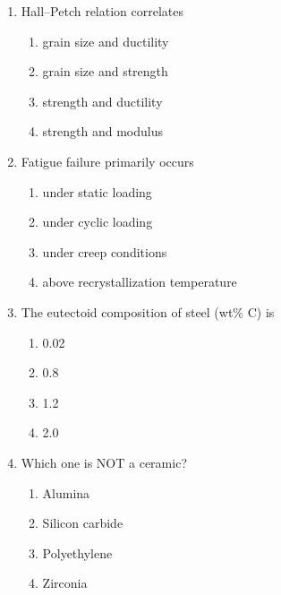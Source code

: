 \documentclass[journal,12pt,onecolumn]{IEEEtran}
\begin{document}
\begin{enumerate}[label=\arabic*)]
\item Hall–Petch relation correlates  
\hfill{} \\

\vspace{0.2cm}
\begin{enumerate}[label=\alph*)]
\item grain size and ductility
\item grain size and strength
\item strength and ductility
\item strength and modulus
\end{enumerate}
\vspace{0.5cm}

\item Fatigue failure primarily occurs  
\hfill{} \\

\vspace{0.2cm}
\begin{enumerate}[label=\alph*)]
\item under static loading
\item under cyclic loading
\item under creep conditions
\item above recrystallization temperature
\end{enumerate}
\vspace{0.4cm}

\item The eutectoid composition of steel (wt\% C) is  
\hfill{} \\

\vspace{0.2cm}
\begin{enumerate}[label=\alph*)]
\item 0.02
\item 0.8
\item 1.2
\item 2.0
\end{enumerate}
\vspace{0.5cm}

\item Which one is NOT a ceramic?  
\hfill{} \\

\vspace{0.2cm}
\begin{enumerate}[label=\alph*)]
\item Alumina
\item Silicon carbide
\item Polyethylene
\item Zirconia
\end{enumerate}
\vspace{0.5cm}


\end{enumerate}
\end{document}
